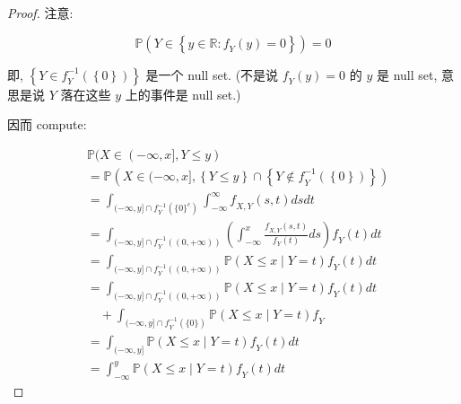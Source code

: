 \begin{proof}

注意:

\[\mathbb{P}\left( {\mathit{Y} \in \left\{ {\mathit{y} \in \mathbb{R}:\mathit{f}_{\mathit{Y}}(\mathit{y}) = 0} \right\}} \right) = 0\]

即, \(\left\{ {\mathit{Y} \in \mathit{f}_{\mathit{Y}}^{- 1}(\left\{ 0 \right\})} \right\}\) 是一个 null set. (不是说 \(\mathit{f}_{\mathit{Y}}(\mathit{y}) = 0\) 的 \(\mathit{y}\) 是 null set, 意思是说 \(\mathit{Y}\) 落在这些 \(\mathit{y}\) 上的事件是 null set.)

因而 compute:

\[\begin{aligned}
 & \mathbb{P}(\mathit{X} \in ( - \infty,\mathit{x}\rbrack,\mathit{Y} \leq \mathit{y}) \\
 & = \mathbb{P}\left( {\mathit{X} \in ( - \infty,\mathit{x}\rbrack,\left\{ {\mathit{Y} \leq \mathit{y}} \right\} \cap \left\{ {\mathit{Y} \notin \mathit{f}_{\mathit{Y}}^{- 1}(\left\{ 0 \right\})} \right\}} \right) \\
 & = \int_{( - \infty,\mathit{y}\rbrack \cap \mathit{f}_{\mathit{Y}}^{- 1}{({\{ 0\}}^{\mathit{c}})}}\int_{- \infty}^{\infty}\mathit{f}_{\mathit{X},\mathit{Y}}(\mathit{s},\mathit{t})\mathit{d}\mathit{s}\mathit{d}\mathit{t} \\
 & = \int_{( - \infty,\mathit{y}\rbrack \cap \mathit{f}_{\mathit{Y}}^{- 1}((0, + \infty))}\left( {\int_{- \infty}^{\mathit{x}}\frac{\mathit{f}_{\mathit{X},\mathit{Y}}(\mathit{s},\mathit{t})}{\mathit{f}_{\mathit{Y}}(\mathit{t})}\mathit{d}\mathit{s}} \right)\mathit{f}_{\mathit{Y}}(\mathit{t})\mathit{d}\mathit{t} \\
 & = \int_{( - \infty,\mathit{y}\rbrack \cap \mathit{f}_{\mathit{Y}}^{- 1}((0, + \infty))}\mathbb{P}(\mathit{X} \leq \mathit{x} \mid \mathit{Y} = \mathit{t})\mathit{f}_{\mathit{Y}}(\mathit{t})\mathit{d}\mathit{t} \\
 & = \int_{( - \infty,\mathit{y}\rbrack \cap \mathit{f}_{\mathit{Y}}^{- 1}((0, + \infty))}\mathbb{P}(\mathit{X} \leq \mathit{x} \mid \mathit{Y} = \mathit{t})\mathit{f}_{\mathit{Y}}(\mathit{t})\mathit{d}\mathit{t} \\
 &\quad + \int_{( - \infty,\mathit{y}\rbrack \cap \mathit{f}_{\mathit{Y}}^{- 1}({\{ 0\}})}\mathbb{P}(\mathit{X} \leq \mathit{x} \mid \mathit{Y} = \mathit{t})\mathit{f}_{\mathit{Y}} \\
 & = \int_{( - \infty,\mathit{y}\rbrack}\mathbb{P}(\mathit{X} \leq \mathit{x} \mid \mathit{Y} = \mathit{t})\mathit{f}_{\mathit{Y}}(\mathit{t})\mathit{d}\mathit{t} \\
 & = \int_{- \infty}^{\mathit{y}}\mathbb{P}(\mathit{X} \leq \mathit{x} \mid \mathit{Y} = \mathit{t})\mathit{f}_{\mathit{Y}}(\mathit{t})\mathit{d}\mathit{t}
\end{aligned}\]

\end{proof}

